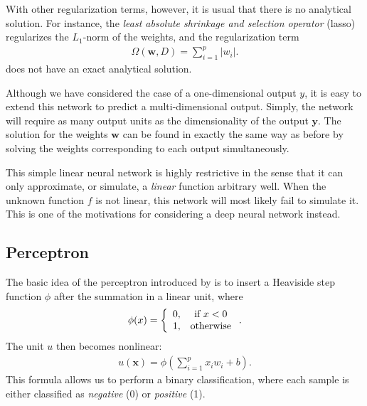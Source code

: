 \documentclass[dissertation,nocontribution,draft*]{aaltoseries}
\newcommand{\vect}[1]{\mathbf{#1}}
\newcommand{\vx}[0]{\vect{x}}
\newcommand{\vy}[0]{\vect{y}}
\newcommand{\vw}[0]{\vect{w}}
\begin{document}
With other regularization terms, however, it is usual that
there is no analytical solution.  For instance, the
\textit{least absolute shrinkage and selection operator}
(lasso) \citep{Tibshirani1994} regularizes the
$L_1$-norm of the weights, and the regularization term 
\begin{align*}
    \Omega(\vw, D) = \sum_{i=1}^p |w_i|.
\end{align*}
does not have an exact analytical solution.

Although we have considered the case of a one-dimensional
output $y$, it is easy to extend this network to predict a
multi-dimensional output. Simply, the network will require
as many output units as the dimensionality of the
output $\vy$. The solution for the weights $\vw$ can be
found in exactly the same way as before by solving the weights
corresponding to each output simultaneously.

This simple linear neural network is highly restrictive in
the
sense that it can only approximate, or simulate, a
\textit{linear} function arbitrary well. When the unknown
function $f$ is not linear, this network will most likely fail
to simulate it.  This is one of the motivations for
considering a deep neural network instead.


\subsection{Perceptron}
\label{sec:perceptron}

The basic idea of the perceptron introduced by
\citet{Rosenblatt1958} is to insert a Heaviside step
function $\phi$ after the summation in a linear unit, where
\begin{align}
    \label{eq:heaviside_func}
    \phi(x) = \left\{ 
    \begin{array}{c c}
        0, &\text{if }x < 0 \\
        1, &\text{otherwise}
    \end{array}
    \right..
\end{align}
The unit $u$ then becomes nonlinear:
\begin{align}
    \label{eq:nonlinear_unit1}
    u(\vx) = \phi\left( 
    \sum_{i=1}^p x_i w_i + b
    \right).
\end{align}
This formula allows us to perform a binary classification,
where each sample is either classified as \textit{negative}
(0) or \textit{positive} (1).
\end{document}
